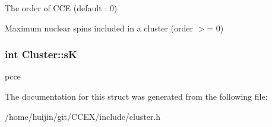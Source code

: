 The order of C\-C\-E (default \-: 0) 

Maximum nuclear spins included in a cluster (order $>$= 0) \hypertarget{structCluster_a7c4d583750b7f37eb2ca537e23ad334f}{
\subsubsection[{s\-K}]{\setlength{\rightskip}{0pt plus 5cm}int Cluster\-::s\-K}}\label{structCluster_a7c4d583750b7f37eb2ca537e23ad334f}
pcce 

The documentation for this struct was generated from the following file\-:\begin{DoxyCompactItemize}
\item 
/home/huijin/git/\-C\-C\-E\-X/include/cluster.\-h\end{DoxyCompactItemize}
